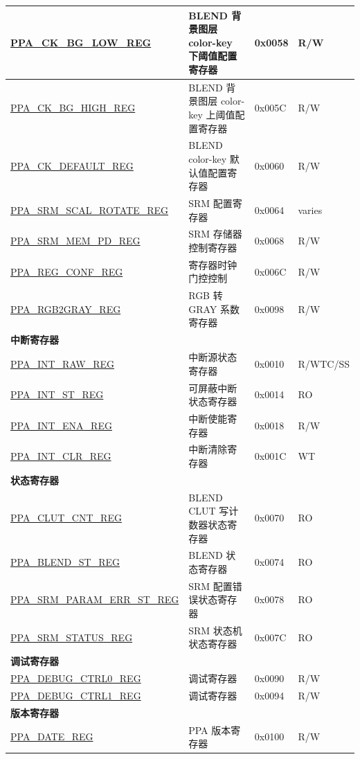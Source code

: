 \begin{longtable}{ | p{6cm} | p{7.2cm} | p{1.3cm} | p{1cm} | }
\hyperref[regdesc:PPACKBGLOWREG]{PPA\_CK\_BG\_LOW\_REG} & BLEND 背景图层 color-key 下阈值配置寄存器 & 0x0058 & R/W \\ \hline
\hyperref[regdesc:PPACKBGHIGHREG]{PPA\_CK\_BG\_HIGH\_REG} & BLEND 背景图层 color-key 上阈值配置寄存器 & 0x005C & R/W \\ \hline
\hyperref[regdesc:PPACKDEFAULTREG]{PPA\_CK\_DEFAULT\_REG} & BLEND color-key 默认值配置寄存器 & 0x0060 & R/W \\ \hline
\hyperref[regdesc:PPASRMSCALROTATEREG]{PPA\_SRM\_SCAL\_ROTATE\_REG} & SRM 配置寄存器 & 0x0064 & varies \\ \hline
\hyperref[regdesc:PPASRMMEMPDREG]{PPA\_SRM\_MEM\_PD\_REG} & SRM 存储器控制寄存器 & 0x0068 & R/W \\ \hline
\hyperref[regdesc:PPAREGCONFREG]{PPA\_REG\_CONF\_REG} & 寄存器时钟门控控制 & 0x006C & R/W \\ \hline
\hyperref[regdesc:PPARGB2GRAYREG]{PPA\_RGB2GRAY\_REG} & RGB 转 GRAY 系数寄存器 & 0x0098 & R/W \\ \hline
\multicolumn{4}{|l|}{\textbf{中断寄存器}} \\ \hline
\hyperref[regdesc:PPAINTRAWREG]{PPA\_INT\_RAW\_REG} & 中断源状态寄存器 & 0x0010 & R/WTC/SS \\ \hline
\hyperref[regdesc:PPAINTSTREG]{PPA\_INT\_ST\_REG} & 可屏蔽中断状态寄存器 & 0x0014 & RO \\ \hline
\hyperref[regdesc:PPAINTENAREG]{PPA\_INT\_ENA\_REG} & 中断使能寄存器 & 0x0018 & R/W \\ \hline
\hyperref[regdesc:PPAINTCLRREG]{PPA\_INT\_CLR\_REG} & 中断清除寄存器 & 0x001C & WT \\ \hline
\multicolumn{4}{|l|}{\textbf{状态寄存器}} \\ \hline
\hyperref[regdesc:PPACLUTCNTREG]{PPA\_CLUT\_CNT\_REG} & BLEND CLUT 写计数器状态寄存器 & 0x0070 & RO \\ \hline
\hyperref[regdesc:PPABLENDSTREG]{PPA\_BLEND\_ST\_REG} & BLEND 状态寄存器 & 0x0074 & RO \\ \hline
\hyperref[regdesc:PPASRMPARAMERRSTREG]{PPA\_SRM\_PARAM\_ERR\_ST\_REG} & SRM 配置错误状态寄存器 & 0x0078 & RO \\ \hline
\hyperref[regdesc:PPASRMSTATUSREG]{PPA\_SRM\_STATUS\_REG} & SRM 状态机状态寄存器 & 0x007C & RO \\ \hline
\multicolumn{4}{|l|}{\textbf{调试寄存器}} \\ \hline
\hyperref[regdesc:PPADEBUGCTRL0REG]{PPA\_DEBUG\_CTRL0\_REG} & 调试寄存器 & 0x0090 & R/W \\ \hline
\hyperref[regdesc:PPADEBUGCTRL1REG]{PPA\_DEBUG\_CTRL1\_REG} & 调试寄存器 & 0x0094 & R/W \\ \hline
\multicolumn{4}{|l|}{\textbf{版本寄存器}} \\ \hline
\hyperref[regdesc:PPADATEREG]{PPA\_DATE\_REG} & PPA 版本寄存器 & 0x0100 & R/W \\ \hline
\end{longtable}
